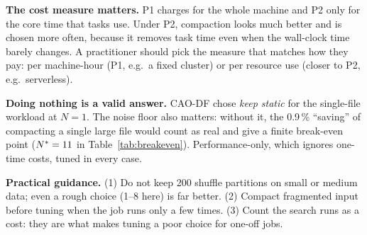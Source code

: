 \textbf{The cost measure matters.} P1 charges for the whole machine and P2 only for the core
time that tasks use. Under P2, compaction looks much better and is chosen more often, because
it removes task time even when the wall-clock time barely changes. A practitioner should pick
the measure that matches how they pay: per machine-hour (P1, e.g.\ a fixed cluster) or per
resource use (closer to P2, e.g.\ serverless).

\textbf{Doing nothing is a valid answer.} CAO-DF chose \emph{keep static} for the single-file
workload at $N = 1$. The noise floor also matters: without it, the 0.9\,\% ``saving'' of
compacting a single large file would count as real and give a finite break-even point
($N^{*} = 11$ in Table~\ref{tab:breakeven}). Performance-only, which ignores one-time costs,
tuned in every case.

\textbf{Practical guidance.} (1) Do not keep 200 shuffle partitions on small or medium data;
even a rough choice (1--8 here) is far better. (2) Compact fragmented input before tuning when
the job runs only a few times. (3) Count the search runs as a cost: they are what makes tuning
a poor choice for one-off jobs.
